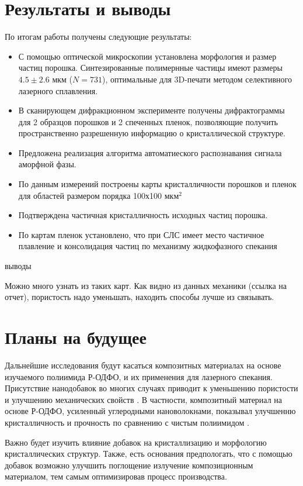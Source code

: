 \section{Результаты и выводы}

По итогам работы получены следующие результаты:

\begin{itemize}
    \item С помощью оптической микроскопии установлена морфология и размер частиц порошка. Синтезированные полимернные частицы имеют размеры $4.5 \pm 2.6$ мкм ($N = 731$), оптимальные для 3D-печати методом селективного лазерного сплавления. 
    \item В сканирующем дифракционном эксперименте получены дифрактограммы для 2 образцов порошков и 2 спеченных пленок, позволяющие получить пространственно разрешенную информацию о кристаллической структуре.
    \item Предложена реализация алгоритма автоматиеского распознавания сигнала аморфной фазы. 
    \item По данным измерений построены карты кристалличности порошков и пленок для областей размером порядка 100х100 мкм$^2$
    \item Подтверждена частичная кристалличность исходных частиц порошка.
    \item По картам пленок установлено, что при СЛС имеет место частичное плавление и консолидация частиц по механизму жидкофазного спекания
\end{itemize}


выводы

Можно много узнать из таких карт.
Как видно из данных механики (ссылка на отчет), пористость надо уменьшать, находить способы лучше из связывать.

\section{Планы на будущее}

Дальнейшие исследования будут касаться композитных материалах на основе изучаемого полиимида Р-ОДФО, и их применения для лазерного спекания.
Присутствие нанодобавок во многих случаях приводит к уменьшению пористости и улучшению механических свойств \cite{sls-compositeб comp-review}. В частности, композитный материал на основе Р-ОДФО, усиленный углеродными нановолокнами, показывал улучшенню кристалличность и прочность по сравнению с чистым полиимидом \cite{pi-formula}.

Важно будет изучить влияние добавок на кристаллизацию и морфологию кристаллических структур. Также, есть основания предпологать, что с помощью добавок возможно улучшить поглощение излучение композиционным материалом, тем самым оптимизировав процесс производства.



